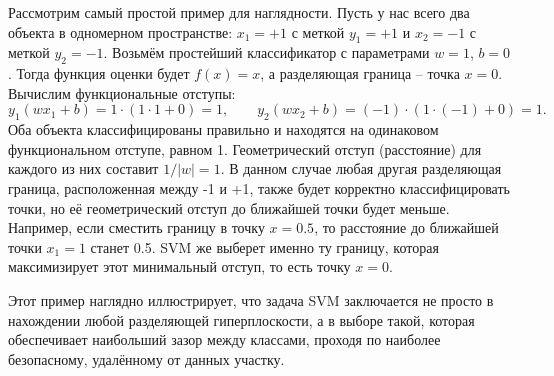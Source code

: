 Рассмотрим самый простой пример для наглядности. Пусть у нас всего два объекта в одномерном пространстве: \( x_1 = +1 \) с меткой \( y_1 = +1 \) и \( x_2 = -1 \) с меткой \( y_2 = -1 \).  
Возьмём простейший классификатор с параметрами \( w = 1 \), \( b = 0 \). Тогда функция оценки будет \( f(x) = x \), а разделяющая граница -- точка \( x = 0 \). Вычислим функциональные отступы:
\[
y_1 (w x_1 + b) = 1 \cdot (1 \cdot 1 + 0) = 1, \qquad y_2 (w x_2 + b) = (-1) \cdot (1 \cdot (-1) + 0) = 1.
\]
Оба объекта классифицированы правильно и находятся на одинаковом функциональном отступе, равном 1. Геометрический отступ (расстояние) для каждого из них составит \( 1 / |w| = 1 \). В данном случае любая другая разделяющая граница, расположенная между -1 и +1, также будет корректно классифицировать точки, но её геометрический отступ до ближайшей точки будет меньше. 
Например, если сместить границу в точку \( x = 0.5 \), то расстояние до ближайшей точки \( x_1 = 1 \) станет 0.5.
SVM же выберет именно ту границу, которая максимизирует этот минимальный отступ, то есть точку \( x = 0 \). 

Этот пример наглядно иллюстрирует, что задача SVM заключается не просто в нахождении любой разделяющей гиперплоскости, а в выборе такой, которая обеспечивает наибольший зазор между классами, проходя по наиболее безопасному, удалённому от данных участку.